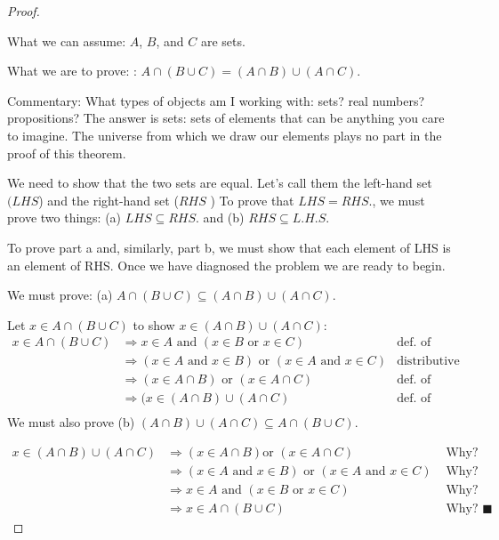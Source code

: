 \documentclass[10pt,]{book}
\theoremstyle{plain}
\theoremstyle{definition}
\theoremstyle{definition}
\theoremstyle{definition}
\begin{document}
\begin{proof}\hypertarget{proof-1}{}
What we can assume: \(A\), \(B\), and \(C\) are sets.%
\par
What we are to prove: : \(A\cap  (B \cup  C) = (A\cap B) \cup  (A \cap  C)\).%
\par
Commentary: What types of objects am I working with: sets? real numbers? propositions? The answer is sets: sets of elements
that can be anything you care to imagine. The universe from which we draw our elements plays no part in the proof of this theorem.%
\par
We need to show that the two sets are equal. Let's call them the left-hand set \((LHS\)) and the right-hand set (\(RHS\) ) To prove that \(LHS = RHS\)., we must prove two things: (a) \(LHS\subseteq RHS\). and (b) \(RHS\subseteq L.H.S\).%
\par
To prove part a and, similarly, part b, we must show that each element of LHS is an element of RHS.  Once we have diagnosed the problem we are ready to begin.%
\par
We must prove:
(a) \(A \cap  (B \cup  C)\subseteq (A\cap B) \cup  (A\cap C)\).%
\par

Let \(x \in  A\cap (B \cup  C)\) to show \(x\in (A\cap B) \cup  (A \cap C)\):
\begin{equation*}
\begin{split}
x \in A \cap (B \cup C) & \Rightarrow x\in A \textrm{ and } (x\in B\textrm{ or } x\in C)& \textrm{def. of union and intersection}\\
& \Rightarrow  (x \in A\textrm{ and }x\in B)\textrm{ or } (x\in A\textrm{ and }x\in C) &\textrm{distributive law of logic}\\
& \Rightarrow  (x \in A \cap B) \textrm{ or } (x \in A \cap C) &\textrm{def. of intersection}\\
& \Rightarrow  (x \in (A \cap B) \cup (A \cap C) &\textrm{def. of union}\\
 \end{split}
\end{equation*}
We must also prove (b) \((A\cap B) \cup  (A\cap C)\subseteq A \cap  (B \cup  C)\).%
\par
\begin{equation*}
\begin{split}
x\in (A\cap B) \cup  (A \cap C)& \Rightarrow  (x\in A\cap B)\text{or } (x\in A\cap C)&\textrm{ Why? } \\
			& \Rightarrow (x\in A\textrm{ and }x\in B)\textrm{ or } (x\in A\textrm{ and }x\in C)&\textrm{ Why? }\\
			&\Rightarrow  x\in A \textrm{ and } (x\in B\textrm{ or }x\in C)&\textrm{ Why? }\\
			&\Rightarrow x\in A\cap (B\cup C)&\textrm{ Why? } \blacksquare
\end{split}
 \end{equation*}%
\end{proof}
\end{document}
